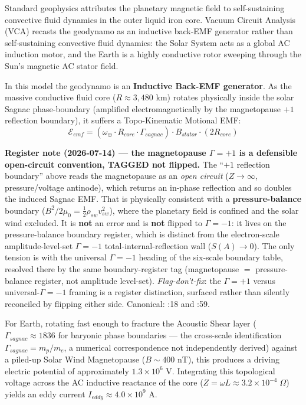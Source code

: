 Standard geophysics attributes the planetary magnetic field to self-sustaining convective fluid dynamics in the outer liquid iron core. Vacuum Circuit Analysis (VCA) recasts the geodynamo as an inductive back-EMF generator rather than self-sustaining convective fluid dynamics: the Solar System acts as a global AC induction motor, and the Earth is a highly conductive rotor sweeping through the Sun's magnetic AC stator field.

In this model the geodynamo is an \textbf{Inductive Back-EMF generator}.
As the massive conductive fluid core ($R \approx 3,480$ km) rotates physically inside the solar Sagnac phase-boundary (amplified electromagnetically by the magnetopause $+1$ reflection boundary), it suffers a Topo-Kinematic Motional EMF:
\begin{equation}
    \mathcal{E}_{emf} = ( \omega_\oplus \cdot R_{core} \cdot \Gamma_{sagnac} ) \cdot B_{stator} \cdot (2 R_{core})
\end{equation}

\noindent\textbf{Register note (2026-07-14) --- the magnetopause
$\Gamma = +1$\gammaundeclared{} is a defensible open-circuit convention, TAGGED not flipped.}
The ``$+1$ reflection boundary'' above reads the magnetopause as an
\emph{open circuit} ($Z \to \infty$, pressure/voltage antinode), which
returns an in-phase reflection and so doubles the induced Sagnac EMF.  That
is physically consistent with a \textbf{pressure-balance} boundary
($B^2/2\mu_0 = \tfrac12 \rho_{sw} v_{sw}^2$), where the planetary field is
confined and the solar wind excluded.  It is \textbf{not} an error and is
\textbf{not} flipped to $\Gamma = -1$\gammaundeclared{}: it lives on the pressure-balance
boundary register, which is distinct from the electron-scale
amplitude-level-set $\Gamma = -1$\gammaundeclared{} total-internal-reflection wall
($S(A) \to 0$).  The only tension is with the universal $\Gamma = -1$\gammaundeclared{}
heading of the six-scale boundary table, resolved there by the same
boundary-register tag (magnetopause $=$ pressure-balance register, not
amplitude level-set).  \emph{Flag-don't-fix}: the $\Gamma = +1$\gammaundeclared{} versus
universal-$\Gamma = -1$\gammaundeclared{} framing is a register distinction, surfaced rather
than silently reconciled by flipping either side.  Canonical:
:18
and :59.

For Earth, rotating fast enough to fracture the Acoustic Shear layer ($\Gamma_{sagnac} \approx 1836$ for baryonic phase boundaries --- the cross-scale identification $\Gamma_{sagnac} = m_p/m_e$, a numerical correspondence not independently derived) against a piled-up Solar Wind Magnetopause ($B \sim 400$ nT), this produces a driving electric potential of approximately $1.3 \times 10^6$ V. Integrating this topological voltage across the AC inductive reactance of the core ($Z = \omega L \approx 3.2 \times 10^{-4}\;\Omega$) yields an eddy current $I_{eddy} \approx 4.0 \times 10^9$ A.

